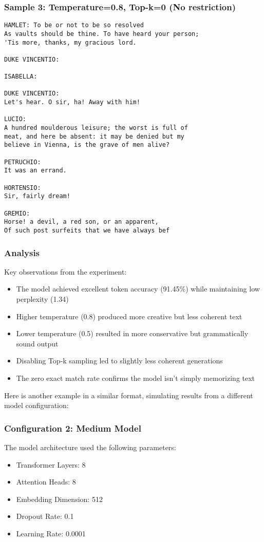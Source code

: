 \subsubsection*{Sample 3: Temperature=0.8, Top-k=0 (No restriction)}
\begin{verbatim}
HAMLET: To be or not to be so resolved
As vaults should be thine. To have heard your person;
'Tis more, thanks, my gracious lord.

DUKE VINCENTIO:

ISABELLA:

DUKE VINCENTIO:
Let's hear. O sir, ha! Away with him!

LUCIO:
A hundred moulderous leisure; the worst is full of
meat, and here be absent: it may be denied but my
believe in Vienna, is the grave of men alive?

PETRUCHIO:
It was an errand.

HORTENSIO:
Sir, fairly dream!

GREMIO:
Horse! a devil, a red son, or an apparent,
Of such post surfeits that we have always bef
\end{verbatim}

\subsubsection*{Analysis}
Key observations from the experiment:
\begin{itemize}
    \item The model achieved excellent token accuracy (91.45\%) while maintaining low perplexity (1.34)
    \item Higher temperature (0.8) produced more creative but less coherent text
    \item Lower temperature (0.5) resulted in more conservative but grammatically sound output
    \item Disabling Top-k sampling led to slightly less coherent generations
    \item The zero exact match rate confirms the model isn't simply memorizing text
\end{itemize}

Here is another example in a similar format, simulating results from a different model configuration:

\subsubsection*{Configuration 2: Medium Model}

The model architecture used the following parameters:
\begin{itemize}
    \item Transformer Layers: 8
    \item Attention Heads: 8
    \item Embedding Dimension: 512
    \item Dropout Rate: 0.1
    \item Learning Rate: 0.0001
\end{itemize}

